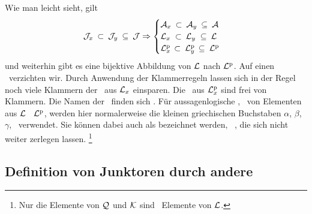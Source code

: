 Wie man leicht sieht, gilt
\begin{equation}
	\mathcal{J}_x      \: \subset \: \mathcal{J}_y  \: \subseteq \: \mathcal{J} \Rightarrow
	\begin{cases}
		\mathcal{A}_x  \: \subset \: \mathcal{A}_y  \: \subseteq \: \mathcal{A} \\
		\mathcal{L}_x  \; \subset \: \mathcal{L}_y  \; \subseteq \: \mathcal{L} \\
		\mathcal{L}^\mathrm{p}_x \, \subset \: \mathcal{L}^\mathrm{p}_y \, \subseteq \: \mathcal{L}^\mathrm{p}
	\end{cases}
\end{equation}
und weiterhin gibt es eine bijektive Abbildung von $\mathcal{L}$ nach $\mathcal{L}^\mathrm{p}$. Auf einen \Beweis\ verzichten wir.
%
Durch Anwendung der Klammerregeln  lassen sich in der Regel noch viele Klammern der \Formeln\ aus $\mathcal{L}_x$ einsparen.
Die \Formeln\ aus $\mathcal{L}^\mathrm{p}_x$ sind frei von Klammern.
Die Namen der \Junktoren\ finden sich .
Für aussagenlogische \Formeln, \textdh\ von Elementen aus $\mathcal{L}$ \textbzgl\ $\mathcal{L}^\mathrm{p}$, werden hier normalerweise die kleinen griechischen Buchstaben $\alpha$, $\beta$, $\gamma$, \textusw\ verwendet.
Sie können dabei auch als  bezeichnet werden, \textdh\ \Formeln, die sich nicht weiter zerlegen lassen.%
\footnote{%
	Nur die Elemente von $\mathcal{Q}$ und $\mathcal{K}$ sind \unzerlegbare\ Elemente von $\mathcal{L}$.
}

\subsection{Definition von Junktoren durch andere}%
\label{sub:ausJunktorDef}

